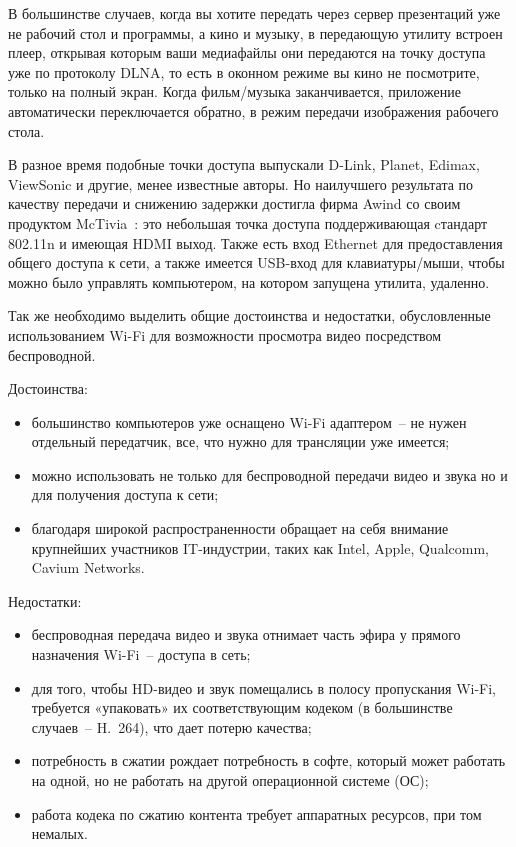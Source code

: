 В большинстве случаев, когда вы хотите передать через сервер презентаций уже не рабочий стол и программы, а кино и музыку, в передающую утилиту встроен плеер, открывая которым ваши медиафайлы они передаются на точку доступа уже по протоколу DLNA, то есть в оконном режиме вы кино не посмотрите, только на полный экран. Когда фильм/музыка заканчивается, приложение автоматически переключается обратно, в режим передачи изображения рабочего стола.

В разное время подобные точки доступа выпускали D-Link, Planet, Edimax, ViewSonic и другие, менее известные авторы. Но наилучшего результата по качеству передачи и снижению задержки достигла фирма Awind со своим продуктом McTivia~\cite{awind-mctivia-review}: это небольшая точка доступа поддерживающая cтандарт  802.11n и имеющая HDMI выход. Также есть вход Ethernet для предоставления общего доступа к сети, а также имеется USB-вход для клавиатуры/мыши, чтобы можно было управлять компьютером, на котором запущена утилита, удаленно.

Так же необходимо выделить общие достоинства и недостатки, обусловленные использованием Wi-Fi для возможности просмотра видео посредством беспроводной.

Достоинства:
\begin{itemize}
    \item большинство компьютеров уже оснащено Wi-Fi адаптером~-- не нужен отдельный передатчик, все, что нужно для трансляции уже имеется;
    \item можно использовать не только для беспроводной передачи видео и звука но и для получения доступа к сети;
    \item благодаря широкой распространенности обращает на себя внимание крупнейших участников IT-индустрии, таких как Intel, Apple, Qualcomm, Cavium Networks.
\end{itemize}

Недостатки:
\begin{itemize}
    \item беспроводная передача видео и звука отнимает часть эфира у прямого назначения Wi-Fi~-- доступа в сеть;
    \item для того, чтобы HD-видео и звук помещались в полосу пропускания Wi-Fi, требуется «упаковать» их соответствующим кодеком (в большинстве случаев~-- H.~264), что дает потерю качества;
    \item потребность в сжатии рождает потребность в софте, который может работать на одной, но не работать на другой операционной системе (ОС);
    \item работа кодека по сжатию контента требует аппаратных ресурсов, при том немалых.
\end{itemize}

